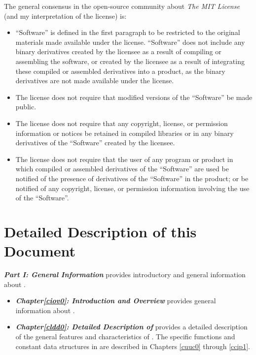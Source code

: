 The general consensus in the open-source community about 
\emph{The MIT License} (and my interpretation of the 
license) is:

\begin{itemize}
\item ``Software'' is defined in the first paragraph to 
      be restricted to the original materials made 
      available under the license.  ``Software'' does not 
      include any binary derivatives created by the licensee 
      as a result of compiling or assembling the software, 
      or created by the licensee as a result of integrating 
      these compiled or assembled derivatives into a 
      product, as the binary derivatives are not made 
      available under the license.
\item The license does not require that modified versions
      of the ``Software'' be made public.
\item The license does not require that any copyright, 
      license, or permission information or notices be 
      retained in compiled libraries or in any binary 
      derivatives of the ``Software'' created by the 
      licensee.
\item The license does not require that the user of any 
      program or product in which compiled or assembled 
      derivatives of the ``Software'' are used be notified 
      of the presence of derivatives of the ``Software'' in 
      the product; or be notified of any copyright, license, 
      or permission information involving the use of the 
      ``Software''.
\end{itemize}


\section{Detailed Description of this Document}
\label{ciov0:sotd0}

\emph{\textbf{Part I: General Information}} provides introductory
and general information about \emph{\productbasenameshort{}}.

\begin{itemize}
\item \emph{\textbf{Chapter\postchapterwordnonstretchable{}\ref{ciov0}: 
      Introduction and Overview}} provides general information
      about \emph{\productbasenameshort{}}.  
\item \emph{\textbf{Chapter\postchapterwordnonstretchable{}\ref{cldd0}: 
      Detailed Description of \productbasenameshort{}}}
      provides a detailed description 
      of the general features and characteristics
      of \emph{\productbasenameshort{}}\@.  The specific
      functions and constant data structures 
      in \emph{\productbasenameshort{}} are described in
      Chapters \ref{cuuc0} through \ref{ccip1}.
\end{itemize}

